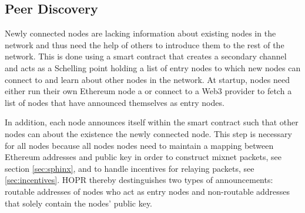 \subsection{Peer Discovery}
\label{sec:p2p:peer-discovery}

Newly connected nodes are lacking information about existing nodes in the network and thus need the help of others to introduce them to the rest of the network. This is done using a smart contract that creates a secondary channel and acts as a Schelling point holding a list of entry nodes to which new nodes can connect to and learn about other nodes in the network. At startup, nodes need either run their own Ethereum node a or connect to a Web3 provider to fetch a list of nodes that have announced themselves as entry nodes.

In addition, each node announces itself within the smart contract such that other nodes can about the existence the newly connected node. This step is necessary for all nodes because all nodes nodes need to maintain a mapping between Ethereum addresses and public key in order to construct mixnet packets, see section \ref{sec:sphinx}, and to handle incentives for relaying packets, see \ref{sec:incentives}. HOPR thereby destinguishes two types of announcements: routable addresses of nodes who act as entry nodes and non-routable addresses that solely contain the nodes' public key.

